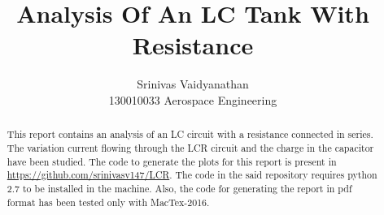 \documentclass[12pt,a4paper]{report}
\begin{document}

\hypersetup{pageanchor=false}
\title{Analysis Of An LC Tank With Resistance}
\author{Srinivas Vaidyanathan \\ 130010033 Aerospace Engineering}
\maketitle
\hypersetup{pageanchor=true}
\begin{abstract}
  This report contains an analysis of an LC circuit with a resistance connected in series.
  The variation current flowing through the LCR circuit and the charge in the capacitor have been studied.
  The code to generate the plots for this report is present in \textcolor{blue}{\url{https://github.com/srinivasv147/LCR}}.
  The code in the said repository requires python 2.7 to be installed in the
  machine. Also, the code for generating the report in pdf format has been tested only with MacTex-2016.
\end{abstract}
\hypersetup{pageanchor=false}
\end{document}
